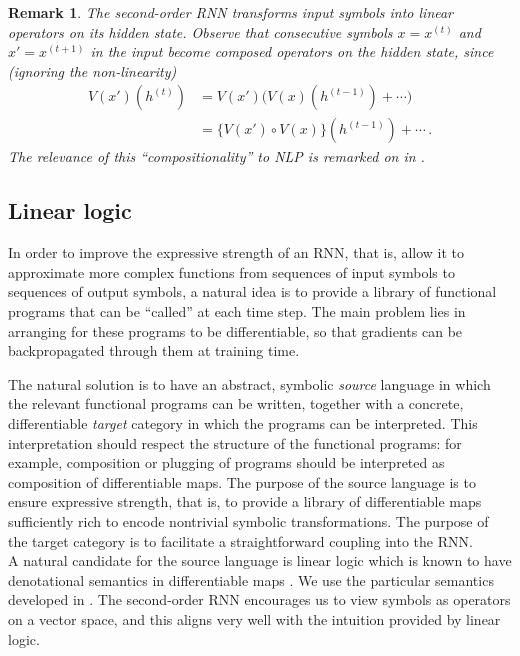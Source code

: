 \documentclass[english,letter paper,12pt,leqno]{article}
\theoremstyle{example}
\newtheorem{remark}[theorem]{Remark}
\numberwithin{equation}{section}
\begin{document}
\begin{remark}
The second-order RNN transforms input symbols into linear operators on its hidden state. Observe that consecutive symbols $x = x^{(t)}$ and $x' = x^{(t+1)}$ in the input become composed operators on the hidden state, since (ignoring the non-linearity)
\begin{align*}
V(x')(h^{(t)}) &= V(x')\big( V(x)(h^{(t-1)}) + \cdots)\\
&= \big\{ V(x') \circ V(x) \big\}( h^{(t-1)} ) + \cdots\,.
\end{align*}
The relevance of this ``compositionality'' to NLP is remarked on in \cite{irsoy}.
\end{remark}

\subsection{Linear logic}

In order to improve the expressive strength of an RNN, that is, allow it to approximate more complex functions from sequences of input symbols to sequences of output symbols, a natural idea is to provide a library of functional programs that can be ``called'' at each time step. The main problem lies in arranging for these programs to be differentiable, so that gradients can be backpropagated through them at training time.

The natural solution is to have an abstract, symbolic \emph{source} language in which the relevant functional programs can be written, together with a concrete, differentiable \emph{target} category in which the programs can be interpreted. This interpretation should respect the structure of the functional programs: for example, composition or plugging of programs should be interpreted as composition of differentiable maps. The purpose of the source language is to ensure expressive strength, that is, to provide a library of differentiable maps sufficiently rich to encode nontrivial symbolic transformations. The purpose of the target category is to facilitate a straightforward coupling into the RNN.
\\

A natural candidate for the source language is linear logic \cite{girard} which is known to have denotational semantics in differentiable maps \cite{??,??}. We use the particular semantics developed in \cite{murfet_logic,murfet_coalg}. The second-order RNN encourages us to view symbols as operators on a vector space, and this aligns very well with the intuition provided by linear logic.
\end{document}
